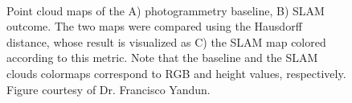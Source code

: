 \begin{figure}[h!]
   \centering
   \\%
   \caption{Point cloud maps of the A) photogrammetry baseline, B) SLAM outcome. The two maps were compared using the Hausdorff distance, whose result is visualized as C) the SLAM map colored according to this metric. Note that the baseline and the SLAM clouds colormaps correspond to RGB and height values, respectively. Figure courtesy of Dr. Francisco Yandun.}
   \label{fig:results_mapping_slam}                %
\end{figure}

